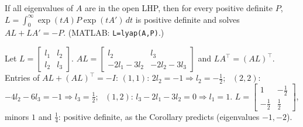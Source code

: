 \begin{thmbox}[title={Corollary 0.59 (Lyapunov's equation)}]
If all eigenvalues of $A$ are in the open LHP, then for every positive definite $P$,
$L=\displaystyle\int_0^\infty\exp(tA)P\exp(tA')\,dt$ is positive definite and solves $\boxed{AL+LA'=-P}$. (MATLAB: \texttt{L=lyap(A,P)}.)
\end{thmbox}
\begin{workbox}[title={Worked example: solve $AL+LA^\top=-I$ for $A=\begin{bmatrix}0&1\\-2&-3\end{bmatrix}$}]
Let $L=\begin{bmatrix}l_1&l_2\\l_2&l_3\end{bmatrix}$. $AL=\begin{bmatrix}l_2&l_3\\-2l_1-3l_2&-2l_2-3l_3\end{bmatrix}$ and $LA^\top=(AL)^\top$. Entries of $AL+(AL)^\top=-I$:
$(1,1)$: $2l_2=-1\Rightarrow l_2=-\frac12$; \ $(2,2)$: $-4l_2-6l_3=-1\Rightarrow l_3=\frac12$; \ $(1,2)$: $l_3-2l_1-3l_2=0\Rightarrow l_1=1$.
$L=\begin{bmatrix}1&-\frac12\\-\frac12&\frac12\end{bmatrix}$, minors $1$ and $\frac14$: positive definite, as the Corollary predicts (eigenvalues $-1,-2$).
\end{workbox}

